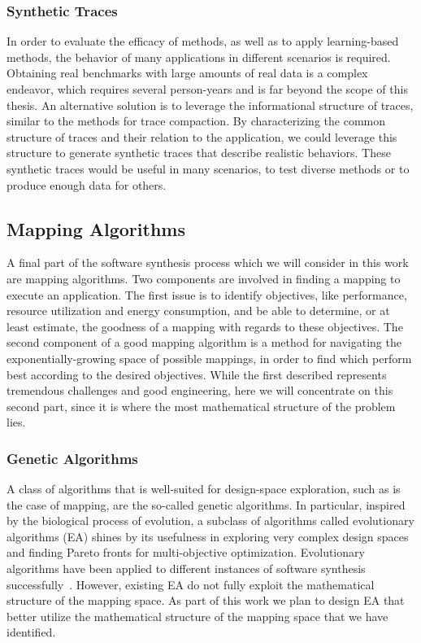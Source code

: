 \documentclass[sigplan,10pt]{acmart}
\begin{document}
\subsubsection{Synthetic Traces}
In order to evaluate the efficacy of methods, as well as to apply learning-based methods, the behavior of many applications in different scenarios is required. 
Obtaining real benchmarks with large amounts of real data is a complex endeavor, which requires several person-years and is far beyond the scope of this thesis. 
An alternative solution is to leverage the informational structure of traces, similar to the methods for trace compaction.
By characterizing the common structure of traces and their relation to the application, we could leverage this structure to generate synthetic traces that describe realistic behaviors.
These synthetic traces would be useful in many scenarios, to test diverse methods or to produce enough data for others.

\subsection{Mapping Algorithms}
A final part of the software synthesis process which we will consider in this work are mapping algorithms.
Two components are involved in finding a mapping to execute an application.
The first issue is to identify objectives, like performance, resource utilization and energy consumption, and be able to determine, or at least estimate, the goodness of a mapping with regards to these objectives.
The second component of a good mapping algorithm is a method for navigating the exponentially-growing space of possible mappings, in order to find which perform best according to the desired objectives.
While the first described represents tremendous challenges and good engineering, here we will concentrate on this second part, since it is where the most mathematical structure of the problem lies. 

\subsubsection{Genetic Algorithms}
A class of algorithms that is well-suited for design-space exploration, such as is the case of mapping, are the so-called genetic algorithms.
In particular, inspired by the biological process of evolution, a subclass of algorithms called evolutionary algorithms (EA) shines by its usefulness in exploring very complex design spaces and finding Pareto fronts for multi-objective optimization.
Evolutionary algorithms have been applied to different instances of software synthesis successfully~\cite{Quan14}. However, existing EA do not fully exploit the mathematical structure of the mapping space.
As part of this work we plan to design EA that better utilize the mathematical structure of the mapping space that we have identified.
\end{document}
